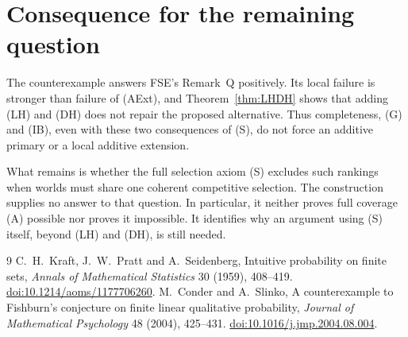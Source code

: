 \documentclass[11pt]{article}
\theoremstyle{remark}\newtheorem{remark}[theorem]{Remark}
\begin{document}
\section{Consequence for the remaining question}

The counterexample answers FSE's Remark~Q positively. Its local failure
is stronger than failure of (AExt), and Theorem~\ref{thm:LHDH} shows
that adding (LH) and (DH) does not repair the proposed alternative.
Thus completeness, (G) and (IB), even with these two consequences of
(S), do not force an additive primary or a local additive extension.

What remains is whether the full selection axiom (S) excludes such
rankings when worlds must share one coherent competitive selection.
The construction supplies no answer to that question. In particular,
it neither proves full coverage (A) possible nor proves it impossible.
It identifies why an argument using (S) itself, beyond (LH) and (DH),
is still needed.

\begin{thebibliography}{9}
 C.~H.~Kraft, J.~W.~Pratt and A.~Seidenberg,
Intuitive probability on finite sets,
\emph{Annals of Mathematical Statistics} 30 (1959), 408--419.
\href{https://doi.org/10.1214/aoms/1177706260}{doi:10.1214/aoms/1177706260}.
 M.~Conder and A.~Slinko,
A counterexample to Fishburn's conjecture on finite linear qualitative
probability, \emph{Journal of Mathematical Psychology} 48 (2004), 425--431.
\href{https://doi.org/10.1016/j.jmp.2004.08.004}{doi:10.1016/j.jmp.2004.08.004}.
\end{thebibliography}
\end{document}
